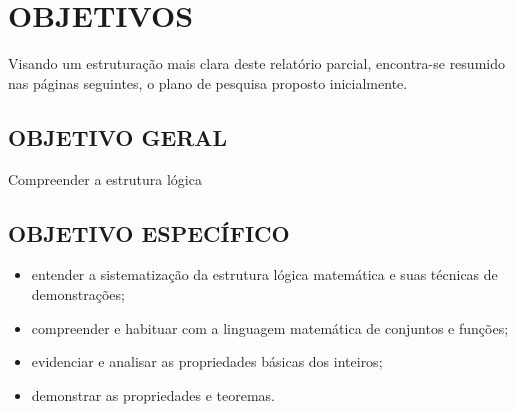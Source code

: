 \chapter{OBJETIVOS}
\label{sec:objetivos}

Visando um estruturação mais clara deste relatório parcial, encontra-se resumido nas páginas seguintes, o plano de pesquisa proposto inicialmente.

  \section{OBJETIVO GERAL}
  \label{sec:objetivo-geral}

Compreender a estrutura lógica 




  \section{OBJETIVO ESPECÍFICO}
  \label{sec:objetivos-especificos}

\begin{itemize}
  \item entender a sistematização da estrutura lógica matemática e suas técnicas de demonstrações;
  \item compreender e habituar com a linguagem matemática de conjuntos e funções;
  \item evidenciar e analisar as propriedades básicas dos inteiros; 
  \item demonstrar as propriedades e teoremas.
\end{itemize}

